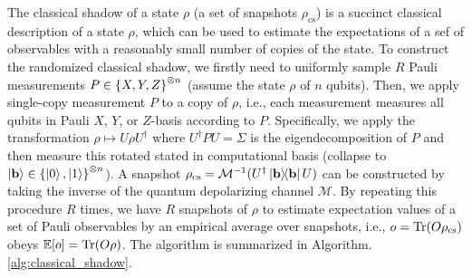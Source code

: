 \documentclass[
aps,
pra,
twocolumn,
floatfix,
]{revtex4-2}
\theoremstyle{plain}
\theoremstyle{definition}
\newcommand{\dm}{\rho}
\newcommand{\cs}{\text{cs}}
\newcommand{\U}{U}
\begin{document}
The classical shadow of a state $\dm$ (a set of snapshots $\dm_{\cs}$) is a succinct classical description of a state $\dm$, which can be used to estimate the expectations of a sef of observables with a reasonably small number of copies of the state.
To construct the randomized classical shadow, we firstly need to uniformly sample $R$ Pauli measurements $P\in\qty{X,Y,Z}^{\otimes n}$ (assume the state $\dm$ of $n$ qubits).
Then, we apply single-copy measurement $P$ to a copy of $\dm$, i.e., each measurement measures all qubits in Pauli $X$, $Y$, or $Z$-basis according to $P$.
Specifically, we apply the transformation $\dm \mapsto \U \dm \U^\dagger$ where $U^\dagger P U = \Sigma$ is the eigendecomposition of $P$ and then measure this rotated stated in computational basis (collapse to $\ket{\vb{b}}\in\qty{\ket{0},\ket{1}}^{\otimes n}$).
A snapshot $\dm_{\cs}=\mathcal{M}^{-1}(U^\dagger\op{\vb{b}}U)$ can be constructed by taking the inverse of the quantum depolarizing channel $\mathcal{M}$.
By repeating this procedure $R$ times, we have $R$ snapshots of $\dm$ to estimate expectation values of a set of Pauli observables by an empirical average over snapshots, 
i.e., $o = \Tr(O \dm_{\cs})$ obeys $\expectation[o] =\Tr(O \dm)$.
The algorithm is summarized in Algorithm. \ref{alg:classical_shadow}.
\end{document}
